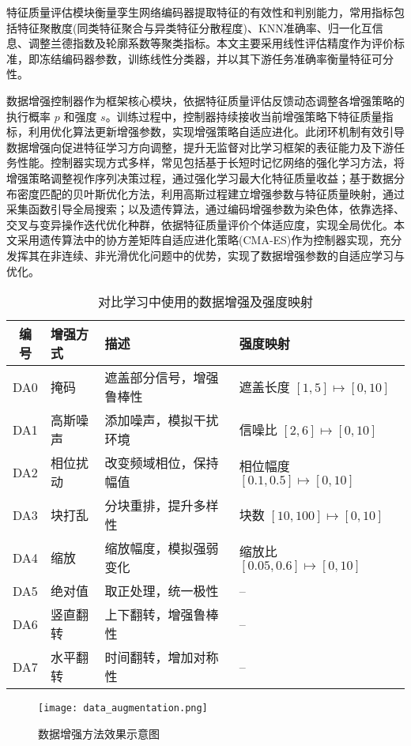 \documentclass[master]{thesis-uestc}
\begin{document}
特征质量评估模块衡量孪生网络编码器提取特征的有效性和判别能力，常用指标包括特征聚散度(同类特征聚合与异类特征分散程度)、KNN准确率、归一化互信息、调整兰德指数及轮廓系数等聚类指标。本文主要采用线性评估精度作为评价标准，即冻结编码器参数，训练线性分类器，并以其下游任务准确率衡量特征可分性。

数据增强控制器作为框架核心模块，依据特征质量评估反馈动态调整各增强策略的执行概率 \(p\) 和强度 \(s\)。训练过程中，控制器持续接收当前增强策略下特征质量指标，利用优化算法更新增强参数，实现增强策略自适应进化。此闭环机制有效引导数据增强向促进特征学习方向调整，提升无监督对比学习框架的表征能力及下游任务性能。控制器实现方式多样，常见包括基于长短时记忆网络的强化学习方法，将增强策略调整视作序列决策过程，通过强化学习最大化特征质量收益；基于数据分布密度匹配的贝叶斯优化方法，利用高斯过程建立增强参数与特征质量映射，通过采集函数引导全局搜索；以及遗传算法，通过编码增强参数为染色体，依靠选择、交叉与变异操作迭代优化种群，依据特征质量评价个体适应度，实现全局优化。本文采用遗传算法中的协方差矩阵自适应进化策略(CMA-ES)作为控制器实现，充分发挥其在非连续、非光滑优化问题中的优势，实现了数据增强参数的自适应学习与优化。

\begin{table}[h]
    \caption{对比学习中使用的数据增强及强度映射}
    \centering
    \begin{tabular}{clp{5cm}l} %
    \toprule
    编号 & 增强方式 & 描述 & 强度映射 \\
    \midrule
    DA0 & 掩码 & 遮盖部分信号，增强鲁棒性 & 遮盖长度 $[1,5] \mapsto [0,10]$ \\
    DA1 & 高斯噪声 & 添加噪声，模拟干扰环境 & 信噪比 $[2,6] \mapsto [0,10]$ \\
    DA2 & 相位扰动 & 改变频域相位，保持幅值 & 相位幅度 $[0.1,0.5] \mapsto [0,10]$ \\
    DA3 & 块打乱 & 分块重排，提升多样性 & 块数 $[10,100] \mapsto [0,10]$ \\
    DA4 & 缩放 & 缩放幅度，模拟强弱变化 & 缩放比 $[0.05,0.6] \mapsto [0,10]$ \\
    DA5 & 绝对值 & 取正处理，统一极性 & -- \\
    DA6 & 竖直翻转 & 上下翻转，增强鲁棒性 & -- \\
    DA7 & 水平翻转 & 时间翻转，增加对称性 & -- \\
    \bottomrule
    \end{tabular}
    \label{tab:augmentation_descriptions}
\end{table}

\begin{figure}[H]
    \centering
    \texttt{[image: data\_augmentation.png]}
    \caption{数据增强方法效果示意图}
    \label{data_augmentation}
\end{figure}
\end{document}
